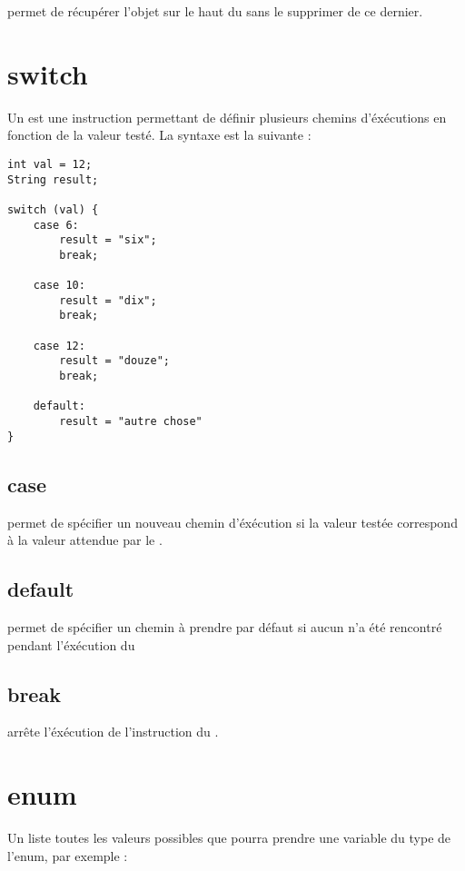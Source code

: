 permet de récupérer l'objet sur le haut du  sans le supprimer de ce dernier.

\section{switch}

Un  est une instruction permettant de définir plusieurs chemins d'éxécutions en fonction de la valeur testé. La syntaxe est la suivante :

\begin{verbatim}
int val = 12;
String result;

switch (val) {
    case 6:
        result = "six";
        break;
        
    case 10:
        result = "dix";
        break;
        
    case 12:
        result = "douze";
        break;
        
    default:
        result = "autre chose"
}
\end{verbatim}

\subsection{case}

 permet de spécifier un nouveau chemin d'éxécution si la valeur testée correspond à la valeur attendue par le .

\subsection{default}

 permet de spécifier un chemin à prendre par défaut si aucun  n'a été rencontré pendant l'éxécution du 

\subsection{break}

 arrête l'éxécution de l'instruction du .

\section{enum}

Un  liste toutes les valeurs possibles que pourra prendre une variable du type de l'enum, par exemple :

